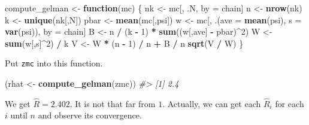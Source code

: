 \documentclass[]{book}
\newenvironment{Shaded}{\begin{snugshade}}{\end{snugshade}}
\newcommand{\CommentTok}[1]{\textcolor[rgb]{0.56,0.35,0.01}{\textit{#1}}}
\newcommand{\ControlFlowTok}[1]{\textcolor[rgb]{0.13,0.29,0.53}{\textbf{#1}}}
\newcommand{\DataTypeTok}[1]{\textcolor[rgb]{0.13,0.29,0.53}{#1}}
\newcommand{\DecValTok}[1]{\textcolor[rgb]{0.00,0.00,0.81}{#1}}
\newcommand{\KeywordTok}[1]{\textcolor[rgb]{0.13,0.29,0.53}{\textbf{#1}}}
\newcommand{\NormalTok}[1]{#1}
\newcommand{\OperatorTok}[1]{\textcolor[rgb]{0.81,0.36,0.00}{\textbf{#1}}}
\newcommand{\StringTok}[1]{\textcolor[rgb]{0.31,0.60,0.02}{#1}}
\theoremstyle{definition}
\theoremstyle{definition}
\theoremstyle{definition}
\theoremstyle{remark}
\begin{document}
\begin{Shaded}
\begin{Highlighting}[]
\NormalTok{compute_gelman <-}\StringTok{ }\ControlFlowTok{function}\NormalTok{(mc) \{}
\NormalTok{  nk <-}\StringTok{ }
\StringTok{    }\NormalTok{mc[,}
\NormalTok{       .N,}
\NormalTok{       by =}\StringTok{ }\NormalTok{chain]}
\NormalTok{  n <-}\StringTok{ }\KeywordTok{nrow}\NormalTok{(nk)}
\NormalTok{  k <-}\StringTok{ }\KeywordTok{unique}\NormalTok{(nk[,N])}
\NormalTok{  pbar <-}\StringTok{ }\KeywordTok{mean}\NormalTok{(mc[,psi])}
\NormalTok{  w <-}\StringTok{ }
\StringTok{    }\NormalTok{mc[,}
\NormalTok{       .(}\DataTypeTok{ave =} \KeywordTok{mean}\NormalTok{(psi), }\DataTypeTok{s =} \KeywordTok{var}\NormalTok{(psi)),}
\NormalTok{       by =}\StringTok{ }\NormalTok{chain]}
\NormalTok{  B <-}\StringTok{ }\NormalTok{n }\OperatorTok{/}\StringTok{ }\NormalTok{(k }\OperatorTok{-}\StringTok{ }\DecValTok{1}\NormalTok{) }\OperatorTok{*}\StringTok{ }\KeywordTok{sum}\NormalTok{((w[,ave] }\OperatorTok{-}\StringTok{ }\NormalTok{pbar)}\OperatorTok{^}\DecValTok{2}\NormalTok{)}
\NormalTok{  W <-}\StringTok{ }\KeywordTok{sum}\NormalTok{(w[,s]}\OperatorTok{^}\DecValTok{2}\NormalTok{) }\OperatorTok{/}\StringTok{ }\NormalTok{k}
\NormalTok{  V <-}\StringTok{ }\NormalTok{W }\OperatorTok{*}\StringTok{ }\NormalTok{(n }\OperatorTok{-}\StringTok{ }\DecValTok{1}\NormalTok{) }\OperatorTok{/}\StringTok{ }\NormalTok{n }\OperatorTok{+}\StringTok{ }\NormalTok{B }\OperatorTok{/}\StringTok{ }\NormalTok{n}
  \KeywordTok{sqrt}\NormalTok{(V }\OperatorTok{/}\StringTok{ }\NormalTok{W)}
\NormalTok{\}}
\end{Highlighting}
\end{Shaded}

Put \texttt{zmc} into this function.

\begin{Shaded}
\begin{Highlighting}[]
\NormalTok{(rhat <-}\StringTok{ }\KeywordTok{compute_gelman}\NormalTok{(zmc))}
\CommentTok{#> [1] 2.4}
\end{Highlighting}
\end{Shaded}

We get \(\hat{R} = 2.402\). It is not that far from \(1\). Actually, we can get each \(\hat{R}_i\) for each \(i\) until \(n\) and observe its convergence.
\end{document}
